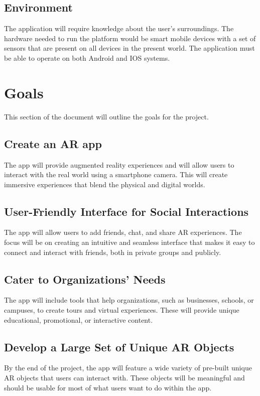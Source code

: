 \documentclass{article}
\begin{document}
\subsection{Environment}

The application will require knowledge about the user’s surroundings. The hardware needed to run the platform would be smart mobile devices with a set of sensors that are present on all devices in the present world. The application must be able to operate on both Android and IOS systems. 

\section{Goals}
This section of the document will outline the goals for the project.

\subsection{Create an AR app}
The app will provide augmented reality experiences and will allow users to interact with the real world using a smartphone camera. This will create immersive experiences that blend the physical and digital worlds.

\subsection{User-Friendly Interface for Social Interactions}
The app will allow users to add friends, chat, and share AR experiences. The focus will be on creating an intuitive and seamless interface that makes it easy to connect and interact with friends, both in private groups and publicly.

\subsection{Cater to Organizations’ Needs}
The app will include tools that help organizations, such as businesses, schools, or campuses, to create tours and virtual experiences. These will provide unique educational, promotional, or interactive content.

\subsection{Develop a Large Set of Unique AR Objects}
By the end of the project, the app will feature a wide variety of pre-built unique AR objects that users can interact with. These objects will be meaningful and should be usable for most of what users want to do within the app.
\end{document}

